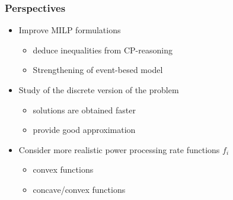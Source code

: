 \documentclass{beamer}
\begin{document}
\begin{frame}
  \frametitle{Perspectives}
  \vfill
    \begin{itemize}
    \item Improve MILP formulations
\pause
      \begin{itemize}
      \item deduce inequalities from CP-reasoning
      \item Strengthening of event-besed model
      \end{itemize}
      \vfill
\pause
    \item Study of the discrete version of the problem
      \begin{itemize}
\pause
      \item solutions are obtained faster  
      \item provide good approximation
      \end{itemize}
      \vfill
\pause
    \item Consider more realistic power processing rate functions
      $f_i$
      \begin{itemize}
\pause
      \item convex functions
      \item concave/convex functions
      \end{itemize}
\pause
    \end{itemize}
  \vfill
\end{frame}
\end{document}
